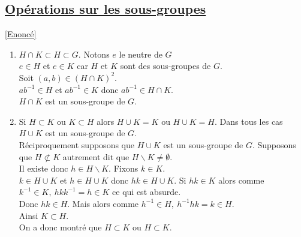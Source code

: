 \documentclass[8pt]{book}
\begin{document}
	\subsection{\underline{Opérations sur les sous-groupes} }
	\label{Opérations sur les sous-groupes corrigé}
	\textcolor{blue}{\hyperref[Opérations sur les sous-groupes]{[Enoncé]}}\\
	\begin{enumerate}[leftmargin=*]
		\item $H\cap K\subset H\subset G$. Notons $e$ le neutre de $G$\\
		$e\in H$ et $e\in K$ car $H$ et $K$ sont des sous-groupes de $G$.\\
		Soit $(a,b)\in \left(H\cap K\right)^2$.\\
		$ab^{-1}\in H$ et $ab^{-1}\in K$ donc $ab^{-1}\in H\cap K$.\\
		$H\cap K$ est un sous-groupe de $G$.
		\item Si $H\subset K$ ou $K\subset H$ alors $H\cup K=K$ ou $H\cup K=H$. Dans tous les cas $H\cup K$ est un sous-groupe de $G$.\\
		Réciproquement supposons que $H\cup K$ est un sous-groupe de $G$. Supposons que $H\not \subset K$ autrement dit que $H\backslash K\ne \emptyset$.\\
		Il existe donc $h\in H\backslash K$. Fixons $k\in K$.\\
		$k\in H\cup K$ et $h\in H\cup K$ donc $hk\in H\cup K$. Si $hk\in K$ alors comme $k^{-1}\in K,\ hkk^{-1}=h\in K$ ce qui est absurde.\\
		Donc $hk\in H$. Mais alors comme $h^{-1}\in H,\ h^{-1}hk=k\in H$.\\
		Ainsi $K\subset H$.\\
		On a donc montré que $H\subset K$ ou $H\subset K$.
	\end{enumerate}
	
\end{document}
